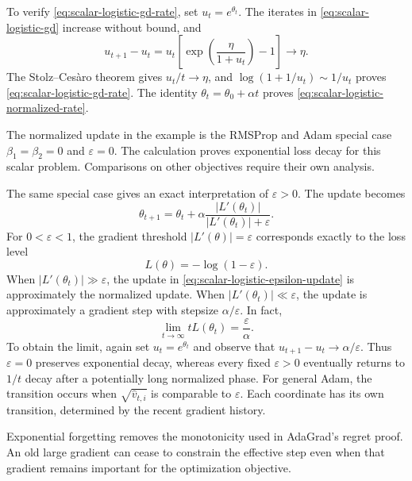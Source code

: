 \documentclass[11pt,twoside]{article}
\theoremstyle{definition}
\theoremstyle{remark}
\begin{document}
To verify \cref{eq:scalar-logistic-gd-rate}, set
$u_t=e^{\theta_t}$. The iterates in \cref{eq:scalar-logistic-gd} increase
without bound, and
\[
 u_{t+1}-u_t
 =u_t\left[
   \exp\left(\frac\eta{1+u_t}\right)-1
  \right]\longrightarrow\eta.
\]
The Stolz--Ces\`aro theorem gives $u_t/t\to\eta$, and
$\log(1+1/u_t)\sim1/u_t$ proves
\cref{eq:scalar-logistic-gd-rate}. The identity
$\theta_t=\theta_0+\alpha t$ proves
\cref{eq:scalar-logistic-normalized-rate}.

The normalized update in the example is the RMSProp and Adam special case
$\beta_1=\beta_2=0$ and $\varepsilon=0$. The calculation proves exponential
loss decay for this scalar problem. Comparisons on other objectives require
their own analysis.

The same special case gives an exact interpretation of
$\varepsilon>0$. The update becomes
\begin{equation}
 \theta_{t+1}
 =\theta_t+\alpha
  \frac{|L'(\theta_t)|}{|L'(\theta_t)|+\varepsilon}.
 \label{eq:scalar-logistic-epsilon-update}
\end{equation}
For $0<\varepsilon<1$, the gradient threshold
$|L'(\theta)|=\varepsilon$ corresponds exactly to the loss level
\begin{equation}
 L(\theta)=-\log(1-\varepsilon).
 \label{eq:scalar-logistic-epsilon-level}
\end{equation}
When $|L'(\theta_t)|\gg\varepsilon$, the update in
\cref{eq:scalar-logistic-epsilon-update} is approximately the normalized
update. When $|L'(\theta_t)|\ll\varepsilon$, the update is approximately a
gradient step with stepsize $\alpha/\varepsilon$. In fact,
\begin{equation}
 \lim_{t\to\infty}tL(\theta_t)=\frac{\varepsilon}{\alpha}.
 \label{eq:scalar-logistic-epsilon-rate}
\end{equation}
To obtain the limit, again set $u_t=e^{\theta_t}$ and observe that
$u_{t+1}-u_t\to\alpha/\varepsilon$. Thus $\varepsilon=0$ preserves
exponential decay, whereas every fixed $\varepsilon>0$ eventually returns to
$1/t$ decay after a potentially long normalized phase. For general Adam, the
transition occurs when $\sqrt{\widehat v_{t,i}}$ is comparable to
$\varepsilon$. Each coordinate has its own transition, determined by the
recent gradient history.

Exponential forgetting removes the monotonicity used in AdaGrad's regret
proof. An old large gradient can cease to constrain the effective step even
when that gradient remains important for the optimization objective.
\end{document}
